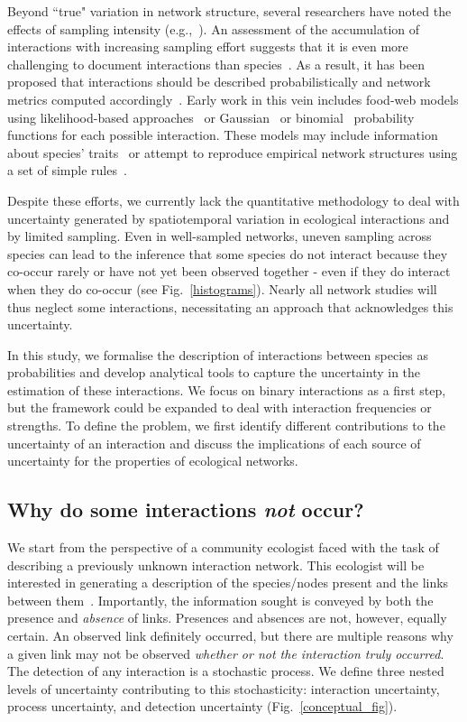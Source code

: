\documentclass[12pt]{article}
\begin{document}
\begin{spacing}{2.0}
    Beyond ``true" variation in network structure, several researchers have noted the effects of sampling intensity (e.g.,~\citealp{Martinez1999,Bluthgen2006,Bluthgen2007}). An assessment of the accumulation of interactions with increasing sampling effort suggests that it is even more challenging to document interactions than species~\citep{Poisot2012}. As a result, it has been proposed that interactions should be described probabilistically and network metrics computed accordingly~\citep{Poisot2016}. Early work in this vein includes food-web models using likelihood-based approaches~\citep{Allesina2008} or Gaussian~\citep{Williams2010} or binomial~\citep{Rohr2016} probability functions for each possible interaction. These models may include information about species' traits~\citep{Rohr2016} or attempt to reproduce empirical network structures using a set of simple rules~\citep{Allesina2008,Williams2010}.


    Despite these efforts, we currently lack the quantitative methodology to deal with uncertainty generated by spatiotemporal variation in ecological interactions and by limited sampling. Even in well-sampled networks, uneven sampling across species can lead to the inference that some species do not interact because they co-occur rarely or have not yet been observed together - even if they do interact when they do co-occur (see Fig.~\ref{histograms}). Nearly all network studies will thus neglect some interactions, necessitating an approach that acknowledges this uncertainty.


    In this study, we formalise the description of interactions between species as probabilities and develop analytical tools to capture the uncertainty in the estimation of these interactions. We focus on binary interactions as a first step, but the framework could be expanded to deal with interaction frequencies or strengths. To define the problem, we first identify different contributions to the uncertainty of an interaction and discuss the implications of each source of uncertainty for the properties of ecological networks. 


    \subsection*{Why do some interactions \emph{not} occur?}

      We start from the perspective of a community ecologist faced with the task of describing a previously unknown interaction network. This ecologist will be interested in generating a description of the species/nodes present and the links between them~\citep{Roslin2016}.  Importantly, the information sought is conveyed by both the presence and \emph{absence} of links. Presences and absences are not, however, equally certain. An observed link definitely occurred, but there are multiple reasons why a given link may not be observed \emph{whether or not the interaction truly occurred}. The detection of any interaction is a stochastic process. We define three nested levels of uncertainty contributing to this stochasticity: interaction uncertainty, process uncertainty, and detection uncertainty (Fig.~\ref{conceptual_fig}).



\end{spacing}
\end{document}
